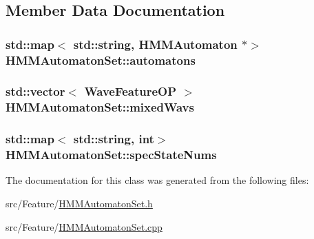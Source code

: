 \subsection{Member Data Documentation}
\hypertarget{class_h_m_m_automaton_set_ae35f541c8b78e3cdca06f20df905aeda}{
\subsubsection[{automatons}]{\setlength{\rightskip}{0pt plus 5cm}std\+::map$<$ std\+::string, {\bf H\+M\+M\+Automaton} $\ast$$>$ H\+M\+M\+Automaton\+Set\+::automatons\hspace{0.3cm}{\ttfamily [private]}}}\label{class_h_m_m_automaton_set_ae35f541c8b78e3cdca06f20df905aeda}
\hypertarget{class_h_m_m_automaton_set_a255954d8bebfd64588f72f8b1fa13b1b}{
\subsubsection[{mixed\+Wavs}]{\setlength{\rightskip}{0pt plus 5cm}std\+::vector$<$ {\bf Wave\+Feature\+O\+P} $>$ H\+M\+M\+Automaton\+Set\+::mixed\+Wavs\hspace{0.3cm}{\ttfamily [private]}}}\label{class_h_m_m_automaton_set_a255954d8bebfd64588f72f8b1fa13b1b}
\hypertarget{class_h_m_m_automaton_set_a331349a05f8ada38dc5704a214ecb044}{
\subsubsection[{spec\+State\+Nums}]{\setlength{\rightskip}{0pt plus 5cm}std\+::map$<$ std\+::string, int$>$ H\+M\+M\+Automaton\+Set\+::spec\+State\+Nums\hspace{0.3cm}{\ttfamily [private]}}}\label{class_h_m_m_automaton_set_a331349a05f8ada38dc5704a214ecb044}


The documentation for this class was generated from the following files\+:\begin{DoxyCompactItemize}
\item 
src/\+Feature/\hyperlink{_h_m_m_automaton_set_8h}{H\+M\+M\+Automaton\+Set.\+h}\item 
src/\+Feature/\hyperlink{_h_m_m_automaton_set_8cpp}{H\+M\+M\+Automaton\+Set.\+cpp}\end{DoxyCompactItemize}
